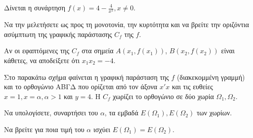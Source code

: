 
Δίνεται η συνάρτηση $f(x)=4-\frac{4}{x^2}, x \neq 0$.

\begin{alist}
\item Να την μελετήσετε ως προς τη μονοτονία, την κυρτότητα και να βρείτε την οριζόντια ασύμπτωτη της γραφικής παράστασης $C_f$ της $f$. 
\item Αν οι εφαπτόμενες της $C_f$ στα σημεία $A(x_1, f(x_1))$, $B(x_2, f(x_2))$ είναι κάθετες, να αποδείξετε ότι $x_1 x_2 = -4$. 
\item Στο παρακάτω σχήμα φαίνεται η γραφική παράσταση της $f$ (διακεκομμένη γραμμή) και το ορθογώνιο ΑΒΓΔ που ορίζεται από τον άξονα $x'x$ και τις ευθείες $x=1, x=\alpha, \alpha > 1$ και $y=4$. Η $C_f$ χωρίζει το ορθογώνιο σε δύο χωρία $\Omega_1, \Omega_2$.
    \begin{rlist}
    \item Να υπολογίσετε, συναρτήσει του $\alpha$, τα εμβαδά $E(\Omega_1), E(\Omega_2)$ των χωρίων. 
    \item Να βρείτε για ποια τιμή του $\alpha$ ισχύει $E(\Omega_1) = E(\Omega_2)$. 
    \end{rlist}
\end{alist}